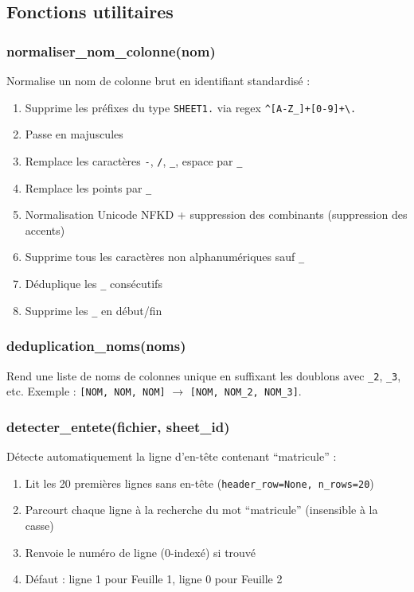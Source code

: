 \documentclass[12pt,a4paper,french]{report}
\begin{document}
\subsection{Fonctions utilitaires}

\subsubsection{normaliser\_nom\_colonne(nom)}

Normalise un nom de colonne brut en identifiant standardisé :
\begin{enumerate}[nosep]
  \item Supprime les préfixes du type \texttt{SHEET1.} via regex
        \texttt{\^{}[A-Z\_]+[0-9]+\textbackslash.}
  \item Passe en majuscules
  \item Remplace les caractères \texttt{-}, \texttt{/}, \texttt{\_},
        espace par \texttt{\_}
  \item Remplace les points par \texttt{\_}
  \item Normalisation Unicode NFKD + suppression des combinants
        (suppression des accents)
  \item Supprime tous les caractères non alphanumériques sauf \texttt{\_}
  \item Déduplique les \texttt{\_} consécutifs
  \item Supprime les \texttt{\_} en début/fin
\end{enumerate}

\subsubsection{deduplication\_noms(noms)}

Rend une liste de noms de colonnes unique en suffixant les doublons avec
\texttt{\_2}, \texttt{\_3}, etc. Exemple :
\texttt{[NOM, NOM, NOM]} $\rightarrow$ \texttt{[NOM, NOM\_2, NOM\_3]}.

\subsubsection{detecter\_entete(fichier, sheet\_id)}

Détecte automatiquement la ligne d'en-tête contenant ``matricule'' :
\begin{enumerate}[nosep]
  \item Lit les 20 premières lignes sans en-tête
        (\texttt{header\_row=None, n\_rows=20})
  \item Parcourt chaque ligne à la recherche du mot ``matricule''
        (insensible à la casse)
  \item Renvoie le numéro de ligne (0-indexé) si trouvé
  \item Défaut : ligne 1 pour Feuille 1, ligne 0 pour Feuille 2
\end{enumerate}
\end{document}
